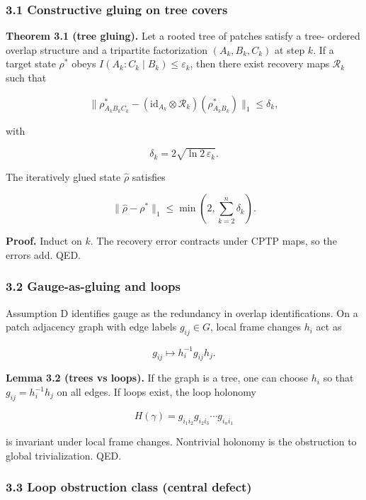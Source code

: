 \subsubsection{3.1 Constructive gluing on tree covers}\label{31-constructive-gluing-on-tree-covers}

\textbf{Theorem 3.1 (tree gluing).} Let a rooted tree of patches satisfy a tree- ordered overlap structure and a tripartite factorization \((A_k, B_k, C_k)\) at step \(k\). If a target state \(\rho^{\ast}\) obeys \(I(A_k:C_k \mid B_k) \le \varepsilon_k\), then there exist recovery maps \(\mathcal{R}_k\) such that

\[
\| \rho^{\ast}_{A_k B_k C_k} - (\mathrm{id}_{A_k} \otimes \mathcal{R}_k)(\rho^{\ast}_{A_k B_k}) \|_1
\le \delta_k,
\]

with

\[
\delta_k = 2 \sqrt{\ln 2\, \varepsilon_k}.
\]

The iteratively glued state \(\hat{\rho}\) satisfies

\[
\| \hat{\rho} - \rho^{\ast} \|_1 \le \min\left(2, \sum_{k=2}^n \delta_k\right).
\]

\textbf{Proof.} Induct on \(k\). The recovery error contracts under CPTP maps, so the errors add. QED.

\subsubsection{3.2 Gauge-as-gluing and loops}\label{32-gauge-as-gluing-and-loops}

Assumption D identifies gauge as the redundancy in overlap identifications. On a patch adjacency graph with edge labels \(g_{ij} \in G\), local frame changes \(h_i\) act as

\[
g_{ij} \mapsto h_i^{-1} g_{ij} h_j.
\]

\textbf{Lemma 3.2 (trees vs loops).} If the graph is a tree, one can choose \(h_i\) so that \(g_{ij} = h_i^{-1} h_j\) on all edges. If loops exist, the loop holonomy

\[
H(\gamma) = g_{i_1 i_2} g_{i_2 i_3} \cdots g_{i_n i_1}
\]

is invariant under local frame changes. Nontrivial holonomy is the obstruction to global trivialization. QED.

\subsubsection{3.3 Loop obstruction class (central defect)}\label{33-loop-obstruction-class-central-defect}

